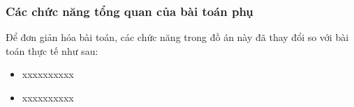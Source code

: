 
\subsubsection{Các chức năng tổng quan của bài toán phụ}

Để đơn giản hóa bài toán, các chức năng trong đồ án này đã thay đổi so với bài toán thực tế như sau:

\begin{itemize}

\item xxxxxxxxxx

\item xxxxxxxxxx

\end{itemize}












% 









